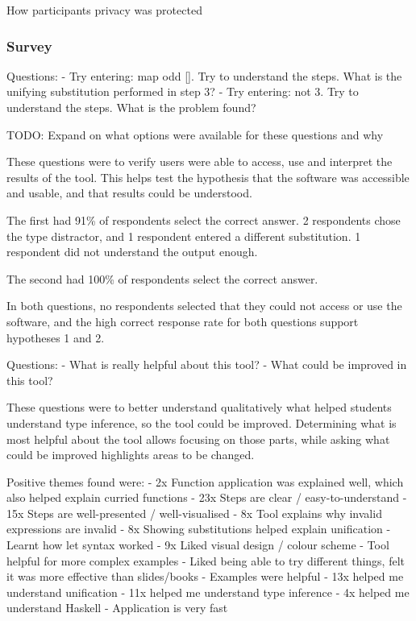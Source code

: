 \documentclass[a4paper,fleqn,12pt]{article}
\begin{document}
How participants privacy was protected
\subsubsection{Survey}\label{id:h.yqiowsgjmohq}
Questions:
- Try entering: map odd []. Try to understand the steps. What is the unifying substitution performed in step 3?
- Try entering: not 3. Try to understand the steps. What is the problem found?

TODO: Expand on what options were available for these questions and why

These questions were to verify users were able to access, use and interpret the results of the tool. This helps test the hypothesis that the software was accessible and usable, and that results could be understood.

The first had 91\% of respondents select the correct answer. 2 respondents chose the type distractor, and 1 respondent entered a different substitution. 1 respondent did not understand the output enough.

The second had 100\% of respondents select the correct answer.

In both questions, no respondents selected that they could not access or use the software, and the high correct response rate for both questions support hypotheses 1 and 2.

Questions:
- What is really helpful about this tool?
- What could be improved in this tool?

These questions were to better understand qualitatively what helped students understand type inference, so the tool could be improved. Determining what is most helpful about the tool allows focusing on those parts, while asking what could be improved highlights areas to be changed.

Positive themes found were:
- 2x Function application was explained well, which also helped explain curried functions
- 23x Steps are clear / easy-to-understand
- 15x Steps are well-presented / well-visualised
- 8x Tool explains why invalid expressions are invalid
- 8x Showing substitutions helped explain unification
- Learnt how let syntax worked
- 9x Liked visual design / colour scheme
- Tool helpful for more complex examples
- Liked being able to try different things, felt it was more effective than slides/books
- Examples were helpful
- 13x helped me understand unification
- 11x helped me understand type inference
- 4x helped me understand Haskell
- Application is very fast
\end{document}
